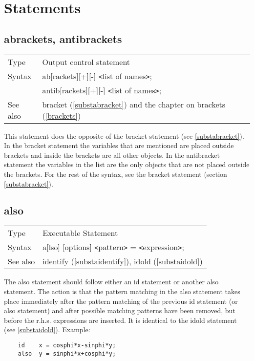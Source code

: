 
\chapter{Statements}
\label{statements}


\section{abrackets, antibrackets}
\label{substaabrackets}

\noindent \begin{tabular}{ll}
Type & Output control statement\\
Syntax & ab[rackets][+][-] {\tt<}list of names{\tt>}; \\
& antib[rackets][+][-] {\tt<}list of names{\tt>}; \\
See also & bracket (\ref{substabracket}) and the chapter on brackets 
     (\ref{brackets})
\end{tabular} \vspace{4mm}

\noindent
This statement does the opposite of 
the bracket statement (see \ref{substabracket}). In the bracket statement 
the variables that are mentioned are placed outside brackets and inside the 
brackets are all other objects. In the antibracket statement the variables 
in the list are the only objects that are not placed outside the brackets. 
For the rest of the syntax, see the bracket statement (section 
\ref{substabracket}).
\vspace{10mm}

 
\section{also}
\label{substaalso}

\noindent \begin{tabular}{ll}
Type & Executable Statement \\
Syntax & a[lso] [options] {\tt<}pattern{\tt>} = 
         {\tt<}expression{\tt>}; \\
See also & identify (\ref{substaidentify}), idold (\ref{substaidold})
\end{tabular} \vspace{4mm}

\noindent The also statement should follow either an 
id statement or another also statement. The action is that the 
pattern matching in the also statement takes place immediately after the 
pattern matching of the previous id statement (or also statement) and after 
possible matching patterns have been removed, but before the r.h.s. 
expressions are inserted. It is identical to the idold statement (see 
\ref{substaidold}). Example:
\begin{verbatim}
    id    x = cosphi*x-sinphi*y;
    also  y = sinphi*x+cosphi*y;
\end{verbatim}

